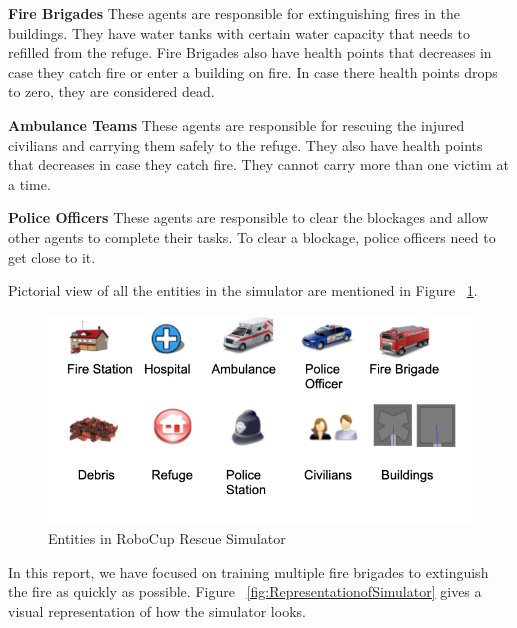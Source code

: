 \documentclass[12pt]{report}
\begin{document}
\textbf{Fire Brigades} These agents are responsible for extinguishing fires in the buildings. They have water tanks with certain water capacity that needs to refilled from the refuge. Fire Brigades also have health points that decreases in case they catch fire or enter a building on fire. In case there health points drops to zero, they are considered dead. 

\textbf{Ambulance Teams} These agents are responsible for rescuing the injured civilians and carrying them safely to the refuge. They also have health points that decreases in case they catch fire. They cannot carry more than one victim at a time. 

\textbf{Police Officers} These agents are responsible to clear the blockages and allow other agents to complete their tasks. To clear a blockage, police officers need to get close to it. 

Pictorial view of all the entities in the simulator are mentioned in Figure ~\ref{fig:RCRSActors}. 

\begin{figure}[!h]
    \centering
    \includegraphics[width=12cm]{RCRSActors.png}
    \caption{Entities in RoboCup Rescue Simulator}
    \label{fig:RCRSActors}
\end{figure}

\hfill

In this report, we have focused on training multiple fire brigades to extinguish the fire as quickly as possible. Figure ~\ref{fig:RepresentationofSimulator} gives a visual representation of how the simulator looks. 
\end{document}
